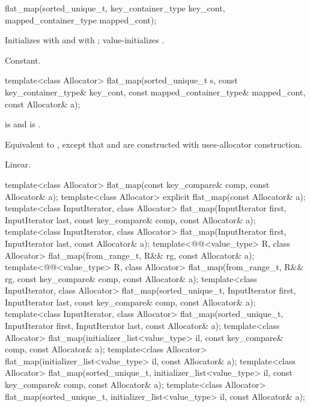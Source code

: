 %
\begin{itemdecl}
flat_map(sorted_unique_t, key_container_type key_cont, mapped_container_type mapped_cont);
\end{itemdecl}

\begin{itemdescr}
\pnum
\effects
Initializes  with  and
 with ;
value-initializes .

\pnum
\complexity
Constant.
\end{itemdescr}

%
\begin{itemdecl}
template<class Allocator>
  flat_map(sorted_unique_t s, const key_container_type& key_cont,
           const mapped_container_type& mapped_cont, const Allocator& a);
\end{itemdecl}

\begin{itemdescr}
\pnum
\constraints
{} is  and
 is .

\pnum
\effects
Equivalent to ,
except that  and  are constructed
with uses-allocator construction.

\pnum
\complexity
Linear.
\end{itemdescr}

%
\begin{itemdecl}
template<class Allocator>
  flat_map(const key_compare& comp, const Allocator& a);
template<class Allocator>
  explicit flat_map(const Allocator& a);
template<class InputIterator, class Allocator>
  flat_map(InputIterator first, InputIterator last, const key_compare& comp, const Allocator& a);
template<class InputIterator, class Allocator>
  flat_map(InputIterator first, InputIterator last, const Allocator& a);
template<@@<value_type> R, class Allocator>
  flat_map(from_range_t, R&& rg, const Allocator& a);
template<@@<value_type> R, class Allocator>
  flat_map(from_range_t, R&& rg, const key_compare& comp, const Allocator& a);
template<class InputIterator, class Allocator>
  flat_map(sorted_unique_t, InputIterator first, InputIterator last,
           const key_compare& comp, const Allocator& a);
template<class InputIterator, class Allocator>
  flat_map(sorted_unique_t, InputIterator first, InputIterator last, const Allocator& a);
template<class Allocator>
  flat_map(initializer_list<value_type> il, const key_compare& comp, const Allocator& a);
template<class Allocator>
  flat_map(initializer_list<value_type> il, const Allocator& a);
template<class Allocator>
  flat_map(sorted_unique_t, initializer_list<value_type> il,
           const key_compare& comp, const Allocator& a);
template<class Allocator>
  flat_map(sorted_unique_t, initializer_list<value_type> il, const Allocator& a);
\end{itemdecl}

